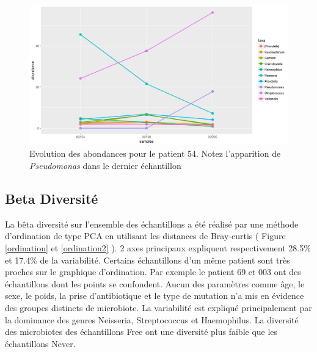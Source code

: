 \documentclass[12pt,a4paper]{article}
\begin{document}
\begin{figure}
\begin{center}
\includegraphics[scale=0.60]{img/curve_054.png}\hfill
\end{center}
\caption{Evolution des abondances pour le patient 54. Notez l'apparition de \textit{Pseudomonas} dans le dernier échantillon}
\label{evolution54}
\end{figure}



\subsection{Beta Diversité}
La bêta diversité sur l’ensemble des échantillons a été réalisé par une méthode d’ordination de type PCA en utilisant les distances de Bray-curtis ( Figure \ref{ordination} et \ref{ordination2} ).
2 axes principaux expliquent respectivement 28.5\% et 17.4\% de la variabilité.
Certains échantillons d’un même patient sont très proches sur le graphique d’ordination. Par exemple le patient 69 et 003 ont des échantillons dont les points se confondent.
Aucun des paramètres comme âge, le sexe, le poids, la prise d'antibiotique et le type de mutation n’a mis en évidence des groupes distincts de microbiote. La variabilité est expliqué principalement par la dominance des genres Neisseria, Streptococcus et Haemophilus.
La diversité des microbiotes des échantillons Free ont une diversité plus faible que les échantillons Never. 
\end{document}
